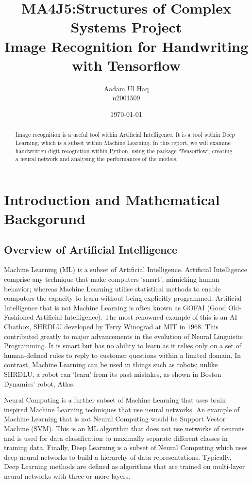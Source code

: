 \documentclass[a4paper,11pt]{article}
\title{MA4J5:Structures of Complex Systems Project \\
Image Recognition for Handwriting with Tensorflow}
\author{Aadam Ul Haq \\
u2001509}
\date{\today} %
\theoremstyle{plain} %
\theoremstyle{definition} %
\theoremstyle{remark} %
\begin{document}
  

\maketitle  
\begin{abstract}
Image recognition is a useful tool within Artificial Intelligence. It is a tool within Deep Learning, which is a subset within Machine Learning. In this report, we will examine handwritten digit recognition within Python, using the package `Tensorflow', creating a neural network and analysing the performances of the models.
\end{abstract}
\tableofcontents 

\pagebreak

\section{Introduction and Mathematical Backgorund}

\subsection{Overview of Artificial Intelligence}

Machine Learning (ML) is a subset of Artificial Intelligence. Artificial Intelligence comprise any technique that make computers `smart', mimicking human behavior; whereas Machine Learning utilise statistical methods to enable computers the capacity to learn without being explicitly programmed. Artificial Intelligence that is not Machine Learning is often known as GOFAI (Good Old-Fashioned Artificial Intelligence). The most renowned example of this is an AI Chatbox, SHRDLU developed by Terry Winograd at MIT in $1968$. This contributed greatly to  major advancements in the evolution of Neural Linguistic Programming. It is smart but has no
ability to learn as it relies only on a set of human-defined
rules to reply to customer questions within a limited domain. In contrast, Machine Learning can be used in things such as robots; unlike SHRDLU, a robot can `learn' from its past mistakes, as shown in Boston Dynamics' robot, Atlas.

Neural Computing is a further subset of Machine Learning that uses brain inspired Machine Learning techniques that use neural networks. An example of Machine Learning that is not Neural Computing would be Support Vector Machine (SVM). This is an ML algorithm that
does not use networks of
neurons  and is used for data classification to maximally separate different classes in  training data. Finally, Deep Learning is a subset of Neural Computing which uses deep neural networks to build a hierarchy of data representations. Typically, Deep Learning methods are defined as algorithms that are trained on
multi-layer neural networks with three or more layers.
\end{document}

